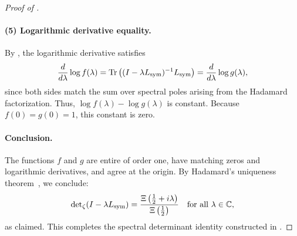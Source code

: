 \begin{proof}[Proof of ]
\paragraph{(5) Logarithmic derivative equality.}
By , the logarithmic derivative satisfies
\[
\frac{d}{d\lambda} \log f(\lambda)
= \operatorname{Tr}\left( (I - \lambda L_{\mathrm{sym}})^{-1} L_{\mathrm{sym}} \right)
= \frac{d}{d\lambda} \log g(\lambda),
\]
since both sides match the sum over spectral poles arising from the Hadamard factorization. Thus, \( \log f(\lambda) - \log g(\lambda) \) is constant. Because \( f(0) = g(0) = 1 \), this constant is zero.

\paragraph{Conclusion.}
The functions \( f \) and \( g \) are entire of order one, have matching zeros and logarithmic derivatives, and agree at the origin. By Hadamard’s uniqueness theorem~\cite[Ch.~3]{Levin1996EntireLectures}, we conclude:
\[
\det\nolimits_{\zeta}(I - \lambda L_{\mathrm{sym}}) = \frac{\Xi\left( \tfrac{1}{2} + i\lambda \right)}{\Xi\left( \tfrac{1}{2} \right)}
\quad \text{for all } \lambda \in \mathbb{C},
\]
as claimed. This completes the spectral determinant identity constructed in .
\end{proof}
